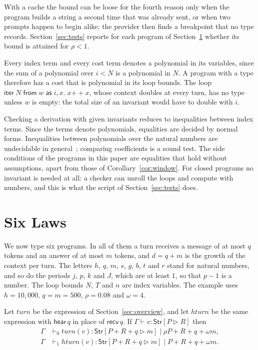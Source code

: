 \documentclass[acmsmall,nonacm,screen]{acmart}
\newcommand{\kw}[1]{\mathsf{#1}}
\newcommand{\Str}[2]{\kw{Str}[#1 \triangleright #2]}
\newcommand{\cat}{\mathbin{+\!\!+}}
\newcommand{\recv}[1]{\kw{recv}\,#1}
\newcommand{\hear}[1]{\kw{hear}\,#1}
\newcommand{\iter}[4]{\kw{iter}\;#1\;\kw{from}\;#2\;\kw{as}\;#3.\;#4}
\newcommand{\nm}[1]{\mathit{#1}}
\newcommand{\turn}{\nm{turn}}
\newcommand{\hturn}{\nm{hturn}}
\begin{document}
With a cache the bound can be loose for the fourth reason only when the program builds a
string a second time that was already sent, or when two prompts happen to begin alike; the
provider then finds a breakpoint that no type records. Section~\ref{sec:tests} reports for
each program of Section~\ref{sec:laws} whether its bound is attained for $\rho < 1$.

\begin{remark}
Every index term and every cost term denotes a polynomial in its variables, since the sum of a
polynomial over $i < N$ is a polynomial in $N$. A program with a type therefore has a cost
that is polynomial in its loop bounds. The loop $\iter{N}{w}{i,x}{x \cat x}$, whose context
doubles at every turn, has no type unless $w$ is empty: the total size of an invariant would
have to double with $i$.
\end{remark}

\begin{remark}[Checking]
Checking a derivation with given invariants reduces to inequalities between index terms. Since
the terms denote polynomials, equalities are decided by normal forms. Inequalities between
polynomials over the natural numbers are undecidable in general~\cite{davis1973}; comparing
coefficients is a sound test. The side conditions of the programs in this paper are
equalities that hold without assumptions, apart from those of Corollary~\ref{cor:window}. For closed programs no invariant is needed at all: a checker can unroll the
loops and compute with numbers, and this is what the script of Section~\ref{sec:tests} does.
\end{remark}

\section{Six Laws}
\label{sec:laws}

We now type six programs. In all of them a turn receives a message of at most $q$ tokens and
an answer of at most $m$ tokens, and $d = q + m$ is the growth of the context per turn. The
letters $h$, $q$, $m$, $s$, $g$, $b$, $t$ and $r$ stand for natural numbers, and so do the
periods $j$, $p$, $k$ and $J$, which are at least $1$, so that $p - 1$ is a number. The loop
bounds $N$, $T$ and $n$ are index variables. The example uses $h = 10{,}000$, $q = m = 500$,
$\rho = 0.08$ and $\omega = 4$.

\begin{lemma}[A turn]
\label{lem:turn}
Let $\turn$ be the expression of Section~\ref{sec:overview}, and let $\hturn$ be the same
expression with $\hear{q}$ in place of $\recv{q}$. If $\Gamma \vdash v : \Str{P}{R}$ then
\begin{align*}
\Gamma &\vdash_0 \turn(v) : \Str{P + R + q}{m} \mid \rho P + R + q + \omega m, \\
\Gamma &\vdash_1 \hturn(v) : \Str{P + R + q}{m} \mid P + R + q + \omega m .
\end{align*}
\end{lemma}
\end{document}
